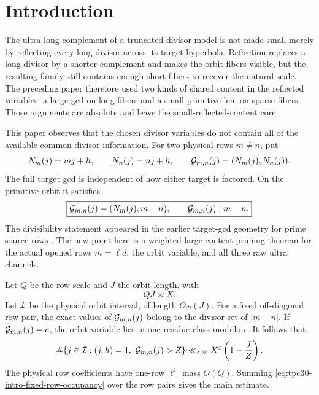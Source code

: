 \section{Introduction}
\label{sec:tpc30-introduction}

The ultra-long complement of a truncated divisor model is not made
small merely by reflecting every long divisor across its target
hyperbola.  Reflection replaces a long divisor by a shorter
complement and makes the orbit fibers visible, but the resulting
family still contains enough short fibers to recover the natural
scale.  The preceding paper therefore used two kinds of shared
content in the reflected variables: a large gcd on long fibers and a
small primitive lcm on sparse fibers \citep{WangTPC29}.  Those
arguments are absolute and leave the small-reflected-content core.

This paper observes that the chosen divisor variables do not contain
all of the available common-divisor information.  For two physical
rows $m\ne n$, put
\begin{equation}
 N_m(j)=mj+h,
 \qquad
 N_n(j)=nj+h,
 \qquad
 \mathcal G_{m,n}(j)=(N_m(j),N_n(j)).
 \label{eq:tpc30-intro-target-gcd}
\end{equation}
The full target gcd is independent of how either target is factored.
On the primitive orbit it satisfies
\begin{equation}
 \boxed{
 \mathcal G_{m,n}(j)=(N_m(j),m-n),
 \qquad
 \mathcal G_{m,n}(j)\mid m-n.}
 \label{eq:tpc30-intro-gcd-identity}
\end{equation}
The divisibility statement appeared in the earlier target-gcd
geometry for prime source rows \citep{WangTPC18}.  The new point here
is a weighted large-content pruning theorem for the actual opened rows
$m=\ell d$, the orbit variable, and all three raw ultra channels.

Let $Q$ be the row scale and $J$ the orbit length, with
\begin{equation}
 QJ\asymp X.
 \label{eq:tpc30-intro-QJ}
\end{equation}
Let $\mathcal I$ be the physical orbit interval, of length
$O_{\mathscr D}(J)$.  For a fixed off-diagonal row pair, the exact values of
$\mathcal G_{m,n}(j)$ belong to the divisor set of $|m-n|$.  If
$\mathcal G_{m,n}(j)=c$, the orbit variable lies in one residue class modulo
$c$.  It follows that
\begin{equation}
 \#\{j\in\cI:(j,h)=1,\ \cG_{m,n}(j)>Z\}
 \ll_{\eps,\mathscr D}X^\eps
 \left(1+\frac JZ\right).
 \label{eq:tpc30-intro-fixed-row-occupancy}
\end{equation}
The physical row coefficients have one-row $\ell^1$ mass $O(Q)$.
Summing \eqref{eq:tpc30-intro-fixed-row-occupancy} over the row pairs
gives the main estimate.

